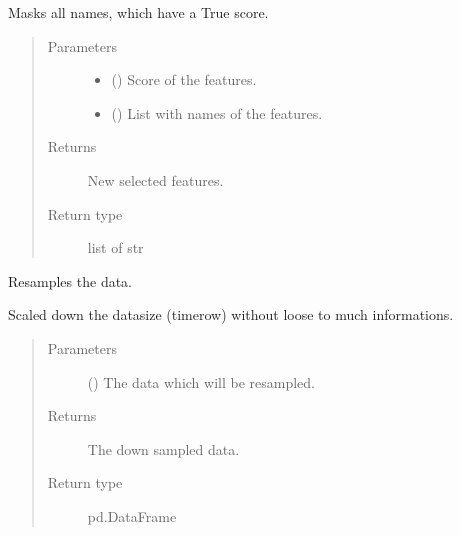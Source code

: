 \documentclass[letterpaper,10pt,english]{sphinxmanual}
\begin{document}
\begin{fulllineitems}
\label{\detokenize{anoog.io:anoog.io.data_io.rename}}
\sphinxAtStartPar
Masks all names, which have a True score.
\begin{quote}\begin{description}
\item[{Parameters}] \leavevmode\begin{itemize}
\item {} 
\sphinxAtStartPar
{} () \textendash{} Score of the features.

\item {} 
\sphinxAtStartPar
{} () \textendash{} List with names of the features.

\end{itemize}

\item[{Returns}] \leavevmode
\sphinxAtStartPar
New selected features.

\item[{Return type}] \leavevmode
\sphinxAtStartPar
list of str

\end{description}\end{quote}

\end{fulllineitems}


\begin{fulllineitems}
\label{\detokenize{anoog.io:anoog.io.data_io.resampling}}
\sphinxAtStartPar
Resamples the data.

\sphinxAtStartPar
Scaled down the data\sphinxhyphen{}size (timerow) without loose to much informations.
\begin{quote}\begin{description}
\item[{Parameters}] \leavevmode
\sphinxAtStartPar
{} () \textendash{} The data which will be resampled.

\item[{Returns}] \leavevmode
\sphinxAtStartPar
The down sampled data.

\item[{Return type}] \leavevmode
\sphinxAtStartPar
pd.DataFrame

\end{description}\end{quote}

\end{fulllineitems}
\end{document}
